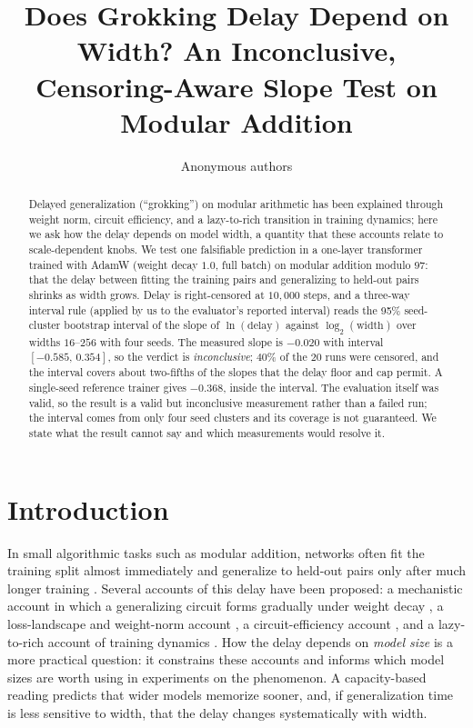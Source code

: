\documentclass{article}
\title{Does Grokking Delay Depend on Width? An Inconclusive, Censoring-Aware Slope Test on Modular Addition}
\author{Anonymous authors}
\begin{document}
\maketitle

\begin{abstract}
Delayed generalization (``grokking'') on modular arithmetic has been explained through weight norm, circuit efficiency, and a lazy-to-rich transition in training dynamics; here we ask how the delay depends on model width, a quantity that these accounts relate to scale-dependent knobs.
We test one falsifiable prediction in a one-layer transformer trained with AdamW (weight decay $1.0$, full batch) on modular addition modulo $97$: that the delay between fitting the training pairs and generalizing to held-out pairs shrinks as width grows.
Delay is right-censored at $10{,}000$ steps, and a three-way interval rule (applied by us to the evaluator's reported interval) reads the 95\% seed-cluster bootstrap interval of the slope of $\ln(\text{delay})$ against $\log_2(\text{width})$ over widths $16$--$256$ with four seeds.
The measured slope is $-0.020$ with interval $[-0.585,\,0.354]$, so the verdict is \emph{inconclusive}; $40\%$ of the $20$ runs were censored, and the interval covers about two-fifths of the slopes that the delay floor and cap permit.
A single-seed reference trainer gives $-0.368$, inside the interval.
The evaluation itself was valid, so the result is a valid but inconclusive measurement rather than a failed run; the interval comes from only four seed clusters and its coverage is not guaranteed. We state what the result cannot say and which measurements would resolve it.
\end{abstract}

\section{Introduction}
\label{sec:intro}
In small algorithmic tasks such as modular addition, networks often fit the training split almost immediately and generalize to held-out pairs only after much longer training \citep{Power2022GrokkingGB}. Several accounts of this delay have been proposed: a mechanistic account in which a generalizing circuit forms gradually under weight decay \citep{Nanda2023ProgressMF}, a loss-landscape and weight-norm account \citep{Liu2022OmnigrokGB}, a circuit-efficiency account \citep{Varma2023ExplainingGT}, and a lazy-to-rich account of training dynamics \citep{Kumar2023GrokkingAT}. How the delay depends on \emph{model size} is a more practical question: it constrains these accounts and informs which model sizes are worth using in experiments on the phenomenon. A capacity-based reading predicts that wider models memorize sooner, and, if generalization time is less sensitive to width, that the delay changes systematically with width.
\end{document}

